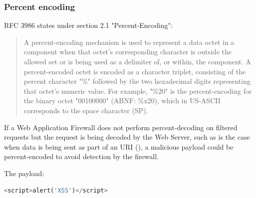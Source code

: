 

\subsubsection{Percent encoding}
\label{sec:percenc}
RFC 3986 states under section 2.1 "Percent-Encoding":
\begin{quote}
	A percent-encoding mechanism is used to represent a data octet in a
	component when that octet's corresponding character is outside the
	allowed set or is being used as a delimiter of, or within, the
	component.  A percent-encoded octet is encoded as a character
	triplet, consisting of the percent character "\%" followed by the two
	hexadecimal digits representing that octet's numeric value.  For
	example, "\%20" is the percent-encoding for the binary octet
	"00100000" (ABNF: \%x20), which in US-ASCII corresponds to the space
	character (SP). \cite{rfc3986}
\end{quote}
If a Web Application Firewall does not perform percent-decoding on filtered requests but the request is being decoded by the Web Server, such as is the case when data is being sent as part of an URI (\cite{rfc3986/sec2.4}), a malicious payload could be percent-encoded to avoid detection by the firewall.

The payload:

\begin{lstlisting}[style=basicStyle, language=Python]
<script>alert('XSS')</script>
\end{lstlisting}

